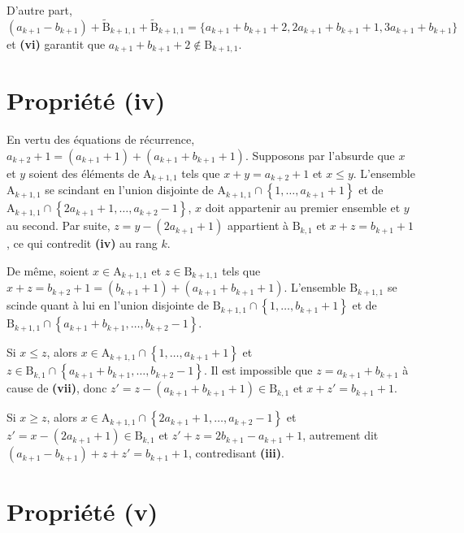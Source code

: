 \documentclass[11pt, oneside]{article}   	%
\newcommand{\interval}[2]{\left\{ #1, \dots, #2 \right\}}
\begin{document}
D'autre part,
\begin{equation}
 (a_{k+1} - b_{k+1}) + \widetilde{\mathrm{B}}_{k + 1, 1} + \widetilde{\mathrm{B}}_{k + 1, 1} = \{ a_{k+1} + b_{k+1} + 2, 2 a_{k+1} + b_{k+1} + 1, 3 a_{k+1} + b_{k+1} \}
\end{equation}
et \textbf{(vi)} garantit que $a_{k+1} + b_{k+1} + 2 \notin \mathrm{B}_{k + 1, 1}$.

\section{Propriété (iv)}

En vertu des équations de récurrence, $a_{k + 2} + 1 = (a_{k+1} + 1) + (a_{k+1} + b_{k+1} + 1)$.
Supposons par l'absurde que $x$ et $y$ soient des éléments de $\mathrm{A}_{k + 1, 1}$ tels que $x + y = a_{k + 2} + 1$ et $x \leqslant y$.
L'ensemble $\mathrm{A}_{k + 1, 1}$ se scindant en l'union disjointe de $\mathrm{A}_{k + 1, 1} \cap \interval{1}{a_{k + 1} + 1}$
et de $\mathrm{A}_{k + 1, 1} \cap \interval{2 a_{k+1} + 1}{a_{k + 2} - 1}$,
$x$ doit appartenir au premier ensemble et $y$ au second.
Par suite, $z = y - (2 a_{k+1} + 1)$ appartient à $\mathrm{B}_{k, 1}$ et $x + z = b_{k + 1} + 1$, ce qui contredit \textbf{(iv)} au rang $k$.

De même, soient $x \in \mathrm{A}_{k + 1, 1}$ et $z \in \mathrm{B}_{k + 1, 1}$ tels que $x + z = b_{k + 2} + 1 = (b_{k+1} + 1) + (a_{k+1} + b_{k+1} + 1)$.
L'ensemble $\mathrm{B}_{k + 1, 1}$ se scinde quant à lui en l'union disjointe de $\mathrm{B}_{k + 1, 1} \cap \interval{1}{b_{k + 1} + 1}$
et de $\mathrm{B}_{k + 1, 1} \cap \interval{a_{k+1} + b_{k+1}}{b_{k + 2} - 1}$.

Si $x \leqslant z$, alors $x \in \mathrm{A}_{k + 1, 1} \cap \interval{1}{a_{k + 1} + 1}$ et $z \in \mathrm{B}_{k, 1} \cap \interval{a_{k+1} + b_{k+1}}{b_{k + 2} - 1}$.
Il est impossible que $z = a_{k+1} + b_{k+1}$ à cause de \textbf{(vii)},
donc $z' = z - (a_{k+1} + b_{k+1} + 1) \in \mathrm{B}_{k, 1}$ et $x + z' = b_{k+1} + 1$.

Si $x \geqslant z$, alors $x \in \mathrm{A}_{k + 1, 1} \cap \interval{2 a_{k+1} + 1}{a_{k + 2} - 1}$
et $z' = x - (2 a_{k+1} + 1) \in \mathrm{B}_{k, 1}$ et $z' + z = 2 b_{k+1} - a_{k+1} + 1$,
autrement dit $(a_{k+1} - b_{k+1}) + z + z' = b_{k+1} + 1$, contredisant \textbf{(iii)}.

\section{Propriété (v)}
\end{document}

